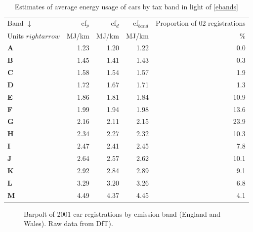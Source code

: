 \begin{table}[htbp]
\caption[Average energy usage of cars by
tax band]{Estimates of average energy usage of cars by
tax band in light of \cref{ebands} }
\begin{center}
\begin{tabular}{lrrrr}
\toprule
Band $\downarrow$ & ef$_p$ & ef$_d$ & ef$_{band}$ & Proportion of 02 registrations \\
Units $rightarrow$ & MJ/km & MJ/km & MJ/km & \% \\
\midrule
\textbf{A} & 1.23 & 1.20 & 1.22 & 0.0 \\
\textbf{B} & 1.45 & 1.41 & 1.43 & 0.3 \\
\textbf{C} & 1.58 & 1.54 & 1.57 & 1.9 \\
\textbf{D} & 1.72 & 1.67 & 1.71 & 1.3 \\
\textbf{E} & 1.86 & 1.81 & 1.84 & 10.9 \\
\textbf{F} & 1.99 & 1.94 & 1.98 & 13.6 \\
\textbf{G} & 2.16 & 2.11 & 2.15 & 23.9 \\
\textbf{H} & 2.34 & 2.27 & 2.32 & 10.3 \\
\textbf{I} & 2.47 & 2.41 & 2.45 & 7.8 \\
\textbf{J} & 2.64 & 2.57 & 2.62 & 10.1 \\
\textbf{K} & 2.92 & 2.84 & 2.89 & 9.1 \\
\textbf{L} & 3.29 & 3.20 & 3.26 & 6.8 \\
\textbf{M} & 4.49 & 4.37 & 4.45 & 4.1 \\
\bottomrule
\end{tabular}\end{center}
\label{tefbands}
\end{table}


\begin{figure}
 \caption[Barpolt of 2001 car registrations by emission band]
 {Barpolt of 2001 car registrations by emission band
(England and Wales). Raw data from DfT).} \label{febandsperc}
\end{figure}

